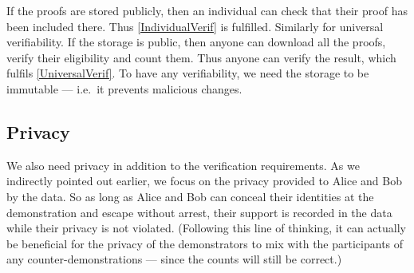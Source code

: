 If the proofs are stored publicly, then an individual can check that their 
proof has been included there.
Thus \cref{IndividualVerif} is fulfilled.
Similarly for universal verifiability.
If the storage is public, then anyone can download all the proofs, verify their 
eligibility and count them.
Thus anyone can verify the result, which fulfils \cref{UniversalVerif}.
To have any verifiability, we need the storage to be immutable --- i.e.\ it 
prevents malicious changes.


\subsection{Privacy}%
\label{Privacy}

We also need privacy in addition to the verification requirements.
As we indirectly pointed out earlier, we focus on the privacy provided to Alice 
and Bob by the data.
So as long as Alice and Bob can conceal their identities at the demonstration 
and escape without arrest, their support is recorded in the data while their 
privacy is not violated.
(Following this line of thinking, it can actually be beneficial for the privacy 
of the demonstrators to mix with the participants of any counter-demonstrations 
--- since the counts will still be correct.)

